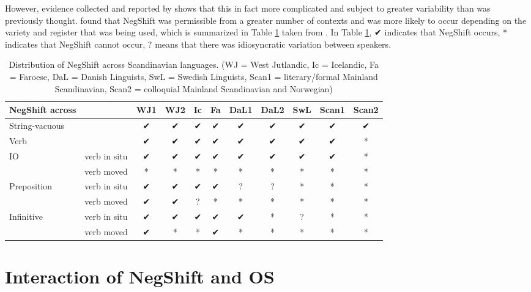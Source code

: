 \documentclass[12pt, letterpaper]{article}
\begin{document}
However, evidence collected and reported by \citet{engelsMicrovariationObjectPositions2011,engelsScandinavianNegativeIndefinites2012} shows that this in fact more complicated and subject to greater variability than was previously thought. \citeauthor{engelsScandinavianNegativeIndefinites2012} found that NegShift was permissible from a greater number of contexts and was more likely to occur depending on the variety and register that was being used, which is summarized in Table \ref{tab:Distribution} taken from \citet{engelsScandinavianNegativeIndefinites2012}. In Table \ref{tab:Distribution}, ✔︎ indicates that NegShift occurs, * indicates that NegShift cannot occur, ? means that there was idiosyncratic variation between speakers.
\begin{table}[!ht]
	\centering
	\caption{Distribution of NegShift across Scandinavian languages. (WJ = West Jutlandic, Ic = Icelandic, Fa = Faroese, DaL = Danish Linguists, SwL = Swedish Linguists, Scan1 = literary/formal Mainland Scandinavian, Scan2 = colloquial Mainland Scandinavian and Norwegian)}
	\label{tab:Distribution}
\begin{tabular}{llccccccccc}
	\hline 
	NegShift across &  & WJ1 & WJ2 & Ic & Fa & DaL1 & DaL2 & SwL & Scan1 & Scan2 \\ 
	\hline 
	String-vacuous &  & ✔︎ & ✔︎ & ✔︎ & ✔︎ & ✔︎ & ✔︎ & ✔︎ & ✔︎ & ✔︎ \\ 
	Verb &  & ✔︎ & ✔︎ & ✔︎ & ✔︎ & ✔︎ & ✔︎ & ✔︎ & ✔︎ & * \\ 
	IO & verb in situ & ✔︎ & ✔︎ & ✔︎ & ✔︎ & ✔︎ & ✔︎ & ✔︎ & ✔︎ & * \\ 
	& verb moved & * & * & * & * & * & * & * & * & * \\ 
	Preposition & verb in situ & ✔︎ & ✔︎ & ✔︎ & ✔︎ & ? & ? & * & * & * \\ 
	& verb moved & ✔︎ & ✔︎ & ? & * & * & * & * & * & * \\ 
	Infinitive & verb in situ & ✔︎ & ✔︎ & ✔︎ & ✔︎ & ✔︎ & * & ? & * & * \\ 
	& verb moved & ✔︎ & * & * & ✔︎ & * & * & * & * & * \\ 
	\hline 
\end{tabular} 
\end{table}

\section{Interaction of NegShift and OS} \label{sec:NEG-OS}
\end{document}
